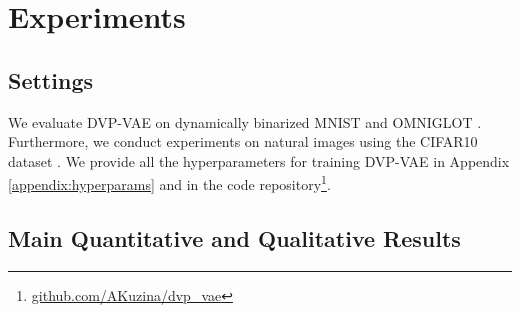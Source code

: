 
\section{Experiments}


\subsection{Settings}
We evaluate DVP-VAE on dynamically binarized MNIST \citep{lecun1998mnist} and OMNIGLOT \citep{lake2015human}. Furthermore, we conduct experiments on natural images using the CIFAR10 dataset \citep{Krizhevsky09learningmultiple}. We provide all the hyperparameters for training DVP-VAE in Appendix \ref{appendix:hyperparams} and in the code repository\footnote{\url{github.com/AKuzina/dvp_vae}}.
\subsection{Main Quantitative and Qualitative Results}\label{sect:exp_image_generations}

